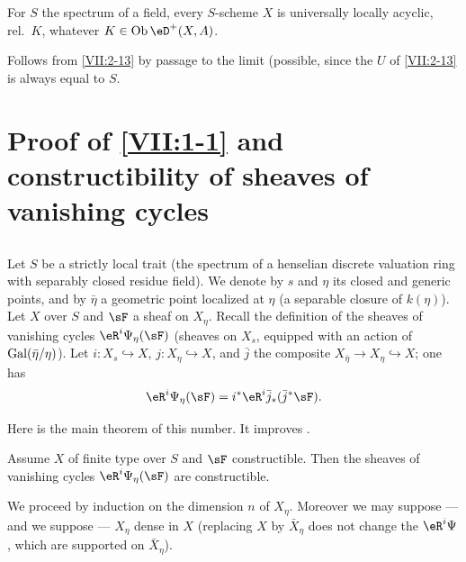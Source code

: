 \begin{corollary_}\label{VII:2-16}
For $S$ the spectrum of a field, every $S$-scheme $X$ is universally
locally acyclic, rel.\ $K$, whatever $K\in\ob\eD^+(X,A)$.
\end{corollary_}

Follows from \ref{VII:2-13} by passage to the limit (possible, since the $U$ of
\ref{VII:2-13} is always equal to $S$.










\section{Proof of \texorpdfstring{\ref{VII:1-1}}{1.1} and constructibility of sheaves of vanishing cycles}\label{VII:3}




\subsection{}\label{VII:3-1}

Let $S$ be a strictly local trait (the spectrum of a henselian discrete
valuation ring with separably closed residue field). We denote by $s$ and
$\eta$ its closed and generic points, and by $\bar\eta$ a geometric
point localized at $\eta$ (a separable closure of $k(\eta)$).
Let $X$ over $S$ and $\sF$ a sheaf on $X_\eta$. Recall the
definition of the sheaves of vanishing cycles $\eR^i \Psi_\eta(\sF)$ (sheaves
on $X_s$, equipped with an action of $\operatorname{Gal}(\bar\eta/\eta)$). Let
$i:X_s\hookrightarrow X$, $j:X_\eta \hookrightarrow X$, and $\bar j$ the
composite $X_{\bar\eta}\to X_\eta \hookrightarrow X$; one has
\[
  \eR^i \Psi_\eta(\sF) = i^\ast \eR^i \bar j_\ast (\bar j^\ast \sF) \text{.}
\]

Here is the main theorem of this number. It improves
\cite[XIII 2.3.1, 2.4.2]{sga7}.




\begin{theorem_}\label{VII:3-2}
Assume $X$ of finite type over $S$ and $\sF$ constructible. Then the
sheaves of vanishing cycles $\eR^i \Psi_\eta(\sF)$ are constructible.
\end{theorem_}

We proceed by induction on the dimension $n$ of $X_\eta$. Moreover we may
suppose --- and we suppose --- $X_\eta$ dense in $X$ (replacing $X$
by $\bar X_\eta$ does not change the $\eR^i \Psi$, which are supported on
$\bar X_\eta$).




